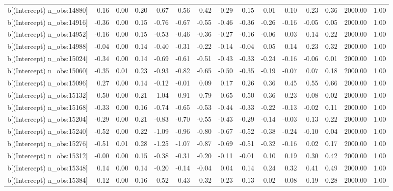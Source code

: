 \begin{table}[ht]
\begin{tabular}{rrrrrrrrrrrrrrr}
  b[(Intercept) n\_obs:14880] & -0.16 & 0.00 & 0.20 & -0.67 & -0.56 & -0.42 & -0.29 & -0.15 & -0.01 & 0.10 & 0.23 & 0.36 & 2000.00 & 1.00 \\ 
  b[(Intercept) n\_obs:14916] & -0.36 & 0.00 & 0.15 & -0.76 & -0.67 & -0.55 & -0.46 & -0.36 & -0.26 & -0.16 & -0.05 & 0.05 & 2000.00 & 1.00 \\ 
  b[(Intercept) n\_obs:14952] & -0.16 & 0.00 & 0.15 & -0.53 & -0.46 & -0.36 & -0.27 & -0.16 & -0.06 & 0.03 & 0.14 & 0.22 & 2000.00 & 1.00 \\ 
  b[(Intercept) n\_obs:14988] & -0.04 & 0.00 & 0.14 & -0.40 & -0.31 & -0.22 & -0.14 & -0.04 & 0.05 & 0.14 & 0.23 & 0.32 & 2000.00 & 1.00 \\ 
  b[(Intercept) n\_obs:15024] & -0.34 & 0.00 & 0.14 & -0.69 & -0.61 & -0.51 & -0.43 & -0.33 & -0.24 & -0.16 & -0.06 & 0.01 & 2000.00 & 1.00 \\ 
  b[(Intercept) n\_obs:15060] & -0.35 & 0.01 & 0.23 & -0.93 & -0.82 & -0.65 & -0.50 & -0.35 & -0.19 & -0.07 & 0.07 & 0.18 & 2000.00 & 1.00 \\ 
  b[(Intercept) n\_obs:15096] & 0.27 & 0.00 & 0.14 & -0.12 & -0.01 & 0.09 & 0.17 & 0.26 & 0.36 & 0.45 & 0.55 & 0.66 & 2000.00 & 1.00 \\ 
  b[(Intercept) n\_obs:15132] & -0.50 & 0.00 & 0.21 & -1.04 & -0.91 & -0.79 & -0.65 & -0.50 & -0.36 & -0.23 & -0.08 & 0.02 & 2000.00 & 1.00 \\ 
  b[(Intercept) n\_obs:15168] & -0.33 & 0.00 & 0.16 & -0.74 & -0.65 & -0.53 & -0.44 & -0.33 & -0.22 & -0.13 & -0.02 & 0.11 & 2000.00 & 1.00 \\ 
  b[(Intercept) n\_obs:15204] & -0.29 & 0.00 & 0.21 & -0.83 & -0.70 & -0.55 & -0.43 & -0.29 & -0.14 & -0.03 & 0.13 & 0.22 & 2000.00 & 1.00 \\ 
  b[(Intercept) n\_obs:15240] & -0.52 & 0.00 & 0.22 & -1.09 & -0.96 & -0.80 & -0.67 & -0.52 & -0.38 & -0.24 & -0.10 & 0.04 & 2000.00 & 1.00 \\ 
  b[(Intercept) n\_obs:15276] & -0.51 & 0.01 & 0.28 & -1.25 & -1.07 & -0.87 & -0.69 & -0.51 & -0.32 & -0.16 & 0.02 & 0.17 & 2000.00 & 1.00 \\ 
  b[(Intercept) n\_obs:15312] & -0.00 & 0.00 & 0.15 & -0.38 & -0.31 & -0.20 & -0.11 & -0.01 & 0.10 & 0.19 & 0.30 & 0.42 & 2000.00 & 1.00 \\ 
  b[(Intercept) n\_obs:15348] & 0.14 & 0.00 & 0.14 & -0.20 & -0.14 & -0.04 & 0.04 & 0.14 & 0.24 & 0.32 & 0.41 & 0.49 & 2000.00 & 1.00 \\ 
  b[(Intercept) n\_obs:15384] & -0.12 & 0.00 & 0.16 & -0.52 & -0.43 & -0.32 & -0.23 & -0.13 & -0.02 & 0.08 & 0.19 & 0.28 & 2000.00 & 1.00 \\ 

\end{tabular}
\end{table}
